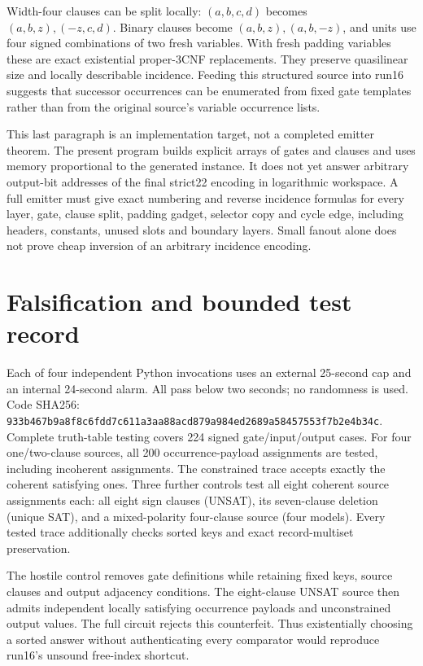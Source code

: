 \documentclass[11pt]{article}
\begin{document}
Width-four clauses can be split locally:
$(a,b,c,d)$ becomes $(a,b,z),(-z,c,d)$.
Binary clauses become $(a,b,z),(a,b,-z)$, and units use four signed
combinations of two fresh variables. With fresh padding variables these
are exact existential proper-3CNF replacements. They preserve
quasilinear size and locally describable incidence. Feeding this structured
source into run16 suggests that successor occurrences can be enumerated
from fixed gate templates rather than from the original source's variable
occurrence lists.

This last paragraph is an implementation target, not a completed emitter
theorem. The present program builds explicit arrays of gates and clauses
and uses memory proportional to the generated instance. It does not yet
answer arbitrary output-bit addresses of the final strict22 encoding in
logarithmic workspace. A full emitter must give exact numbering and reverse
incidence formulas for every layer, gate, clause split, padding gadget,
selector copy and cycle edge, including headers, constants, unused slots
and boundary layers. Small fanout alone does not prove cheap inversion of
an arbitrary incidence encoding.

\section{Falsification and bounded test record}
Each of four independent Python invocations uses an external 25-second cap
and an internal 24-second alarm. All pass below two seconds; no randomness
is used. Code SHA256:
\texttt{933b467b9a8f8c6fdd7c611a3aa88acd879a984ed2689a58457553f7b2e4b34c}.
Complete truth-table testing covers 224 signed gate/input/output cases.
For four one/two-clause sources, all 200 occurrence-payload assignments
are tested, including incoherent assignments. The constrained trace accepts
exactly the coherent satisfying ones. Three further controls test all eight
coherent source assignments each: all eight sign clauses (UNSAT), its
seven-clause deletion (unique SAT), and a mixed-polarity four-clause source
(four models). Every tested trace additionally checks sorted keys and exact
record-multiset preservation.

The hostile control removes gate definitions while retaining fixed keys,
source clauses and output adjacency conditions. The eight-clause UNSAT
source then admits independent locally satisfying occurrence payloads and
unconstrained output values. The full circuit rejects this counterfeit.
Thus existentially choosing a sorted answer without authenticating every
comparator would reproduce run16's unsound free-index shortcut.
\end{document}
